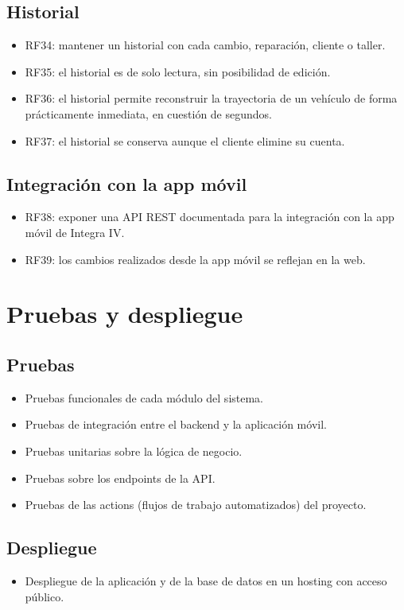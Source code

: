 \documentclass[11pt]{article}
\begin{document}
\subsection{Historial}
\begin{itemize}
  \item RF34: mantener un historial con cada cambio, reparación, cliente o taller.
  \item RF35: el historial es de solo lectura, sin posibilidad de edición.
  \item RF36: el historial permite reconstruir la trayectoria de un vehículo de forma prácticamente inmediata, en cuestión de segundos.
  \item RF37: el historial se conserva aunque el cliente elimine su cuenta.
\end{itemize}

\subsection{Integración con la app móvil}
\begin{itemize}
  \item RF38: exponer una API REST documentada para la integración con la app móvil de Integra IV.
  \item RF39: los cambios realizados desde la app móvil se reflejan en la web.
\end{itemize}

\section{Pruebas y despliegue}

\subsection{Pruebas}
\begin{itemize}
  \item Pruebas funcionales de cada módulo del sistema.
  \item Pruebas de integración entre el backend y la aplicación móvil.
  \item Pruebas unitarias sobre la lógica de negocio.
  \item Pruebas sobre los endpoints de la API.
  \item Pruebas de las actions (flujos de trabajo automatizados) del proyecto.
\end{itemize}

\subsection{Despliegue}
\begin{itemize}
  \item Despliegue de la aplicación y de la base de datos en un hosting con acceso público.
\end{itemize}
\end{document}
